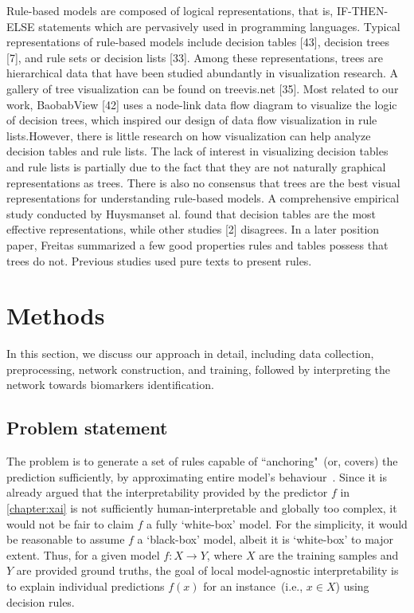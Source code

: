 \hspace*{3.5mm} Rule-based models are composed of logical representations, that is, IF-THEN-ELSE statements which are pervasively used in programming languages. Typical representations of rule-based models include decision tables [43], decision trees [7], and rule sets or decision lists [33]. Among these representations, trees are hierarchical data that have been studied abundantly in visualization research. A gallery of tree visualization can be found on treevis.net [35]. Most related to our work, BaobabView [42] uses a node-link data flow diagram to visualize the logic of decision trees, which inspired our design of data flow visualization in rule lists.However, there is little research on how visualization can help analyze decision tables and rule lists. The lack of interest in visualizing decision tables and rule lists is partially due to the fact that they are not naturally graphical representations as trees. There is also no consensus that trees are the best visual representations for understanding rule-based models. A comprehensive empirical study conducted by Huysmanset al. found that decision tables are the most effective representations, while other studies [2] disagrees. In a later position paper, Freitas summarized a few good properties rules and tables possess that trees do not. Previous studies used pure texts to present rules.  %

\section{Methods} \label{chapter_7:mm}
In this section, we discuss our approach in detail, including data collection, preprocessing, network construction, and training, followed by interpreting the network towards biomarkers identification. 

\subsection{Problem statement}
The problem is to generate a set of rules capable of ``anchoring"~(or, covers) the prediction sufficiently, by approximating entire model's behaviour~\cite{ribeiro2018anchors}. Since it is already argued that the interpretability provided by the predictor ${f}$ in \cref{chapter:xai} is not sufficiently human-interpretable and globally too complex, it would not be fair to claim ${f}$ a fully `white-box' model. For the simplicity, it would be reasonable to assume ${f}$ a `black-box' model, albeit it is `white-box' to major extent. Thus, for a given model ${f}: X \rightarrow Y$, where $X$ are the training samples and $Y$ are provided ground truths, the goal of local model-agnostic interpretability is to explain individual predictions ${f}(x)$ for an instance~(i.e., $x \in X$) using decision rules. %

